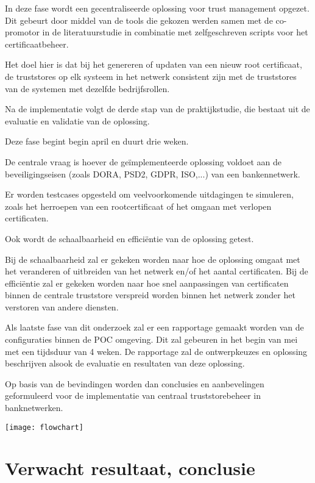 In deze fase wordt een gecentraliseerde oplossing voor trust management opgezet. Dit gebeurt door middel van de tools die gekozen werden samen met de co-promotor in de literatuurstudie in combinatie met zelfgeschreven scripts voor het certificaatbeheer.

Het doel hier is dat bij het genereren of updaten van een nieuw root certificaat, de truststores op elk systeem in het netwerk consistent zijn met de truststores van de systemen met dezelfde bedrijfsrollen.

Na de implementatie volgt de derde stap van de praktijkstudie, die bestaat uit de evaluatie en validatie van de oplossing.

Deze fase begint begin april en duurt drie weken.

De centrale vraag is hoever de geïmplementeerde oplossing voldoet aan de beveiligingseisen (zoals DORA, PSD2, GDPR, ISO,...) van een bankennetwerk.

Er worden testcases opgesteld om veelvoorkomende uitdagingen te simuleren, zoals het herroepen van een rootcertificaat of het omgaan met verlopen certificaten.

Ook wordt de schaalbaarheid en efficiëntie van de oplossing getest.

Bij de schaalbaarheid zal er gekeken worden naar hoe de oplossing omgaat met het veranderen of uitbreiden van het netwerk en/of het aantal certificaten. Bij de efficiëntie zal er gekeken worden naar hoe snel aanpassingen van certificaten binnen de centrale truststore verspreid worden binnen het netwerk zonder het verstoren van andere diensten.

Als laatste fase van dit onderzoek zal er een rapportage gemaakt worden van de configuraties binnen de POC omgeving. Dit zal gebeuren in het begin van mei met een tijdsduur van 4 weken. De rapportage zal de ontwerpkeuzes en oplossing beschrijven alsook de evaluatie en resultaten van deze oplossing.

Op basis van de bevindingen worden dan conclusies en aanbevelingen geformuleerd voor de implementatie van centraal truststorebeheer in banknetwerken. 

\begin{center}
    \texttt{[image: flowchart]}
\end{center}

\section{Verwacht resultaat, conclusie}%
\label{sec:verwachte_resultaten}

